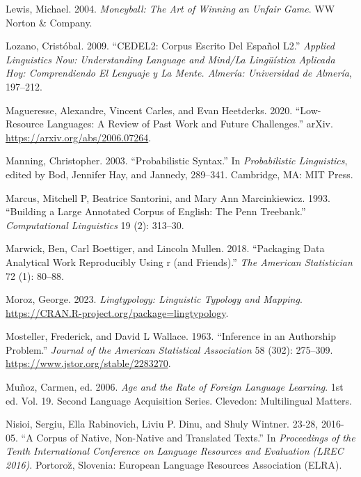 \documentclass[
  letterpaper,
  DIV=11,
  numbers=noendperiod]{scrreport}
\newlength{\cslhangindent}
\newlength{\cslentryspacingunit} %
\newenvironment{CSLReferences}[2] %
 {%
  \setlength{\parindent}{0pt}
  \ifodd #1
  \let\oldpar\par
  \def\par{\hangindent=\cslhangindent\oldpar}
  \fi
  \setlength{\parskip}{#2\cslentryspacingunit}
 }%
 {}
\theoremstyle{definition}
\theoremstyle{remark}
\begin{document}
\begin{CSLReferences}{1}{0}
\leavevmode{}%
Lewis, Michael. 2004. \emph{Moneyball: The Art of Winning an Unfair
Game}. WW Norton \& Company.

\leavevmode{}%
Lozano, Cristóbal. 2009. {``CEDEL2: Corpus Escrito Del Español L2.''}
\emph{Applied Linguistics Now: Understanding Language and Mind/La
Lingüística Aplicada Hoy: Comprendiendo El Lenguaje y La Mente. Almería:
Universidad de Almería}, 197--212.

\leavevmode{}%
Magueresse, Alexandre, Vincent Carles, and Evan Heetderks. 2020.
{``Low-Resource Languages: A Review of Past Work and Future
Challenges.''} arXiv. \url{https://arxiv.org/abs/2006.07264}.

\leavevmode{}%
Manning, Christopher. 2003. {``Probabilistic Syntax.''} In
\emph{Probabilistic Linguistics}, edited by Bod, Jennifer Hay, and
Jannedy, 289--341. Cambridge, MA: MIT Press.

\leavevmode{}%
Marcus, Mitchell P, Beatrice Santorini, and Mary Ann Marcinkiewicz.
1993. {``Building a Large Annotated Corpus of English: The Penn
Treebank.''} \emph{Computational Linguistics} 19 (2): 313--30.

\leavevmode{}%
Marwick, Ben, Carl Boettiger, and Lincoln Mullen. 2018. {``Packaging
Data Analytical Work Reproducibly Using r (and Friends).''} \emph{The
American Statistician} 72 (1): 80--88.

\leavevmode{}%
Moroz, George. 2023. \emph{Lingtypology: Linguistic Typology and
Mapping}. \url{https://CRAN.R-project.org/package=lingtypology}.

\leavevmode{}%
Mosteller, Frederick, and David L Wallace. 1963. {``Inference in an
Authorship Problem.''} \emph{Journal of the American Statistical
Association} 58 (302): 275--309.
\url{https://www.jstor.org/stable/2283270}.

\leavevmode{}%
Muñoz, Carmen, ed. 2006. \emph{Age and the Rate of Foreign Language
Learning}. 1st ed. Vol. 19. Second Language Acquisition Series.
Clevedon: Multilingual Matters.

\leavevmode{}%
Nisioi, Sergiu, Ella Rabinovich, Liviu P. Dinu, and Shuly Wintner.
23-28, 2016-05. {``A Corpus of Native, Non-Native and Translated
Texts.''} In \emph{Proceedings of the Tenth International Conference on
Language Resources and Evaluation (LREC 2016)}. Portoro{z̆}, Slovenia:
European Language Resources Association (ELRA).


\end{CSLReferences}
\end{document}
